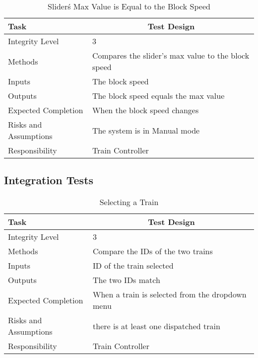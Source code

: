\documentclass[]{article}
\begin{document}
\begin{table}[H]
	\centering
	\caption{Slider\'s Max Value is Equal to the Block Speed}
	\begin{tabular}{|l|l|}
		\hline
		Task & \multicolumn{1}{c|}{Test Design} \\ \hline
		Integrity Level & 3 \\ \hline
		Methods & Compares the slider's max value to the block speed\\ \hline
		Inputs & The block speed\\ \hline
		Outputs & The block speed equals the max value \\ \hline
		Expected Completion & When the block speed changes\\ \hline
		Risks and Assumptions & The system is in Manual mode \\ \hline
		Responsibility &  Train Controller\\ \hline
	\end{tabular}
\end{table}

\subsection{Integration Tests}

\begin{table}[H]
	\centering
	\caption{Selecting a Train}
	\begin{tabular}{|l|l|}
		\hline
		Task & \multicolumn{1}{c|}{Test Design} \\ \hline
		Integrity Level & 3 \\ \hline
		Methods & Compare the IDs of the two trains\\ \hline
		Inputs & ID of the train selected \\ \hline
		Outputs &  The two IDs match\\ \hline
		Expected Completion & When a train is selected from the dropdown menu\\ \hline
		Risks and Assumptions & there is at least one dispatched train\\ \hline
		Responsibility & Train Controller\\ \hline
	\end{tabular}
\end{table}
\end{document}

